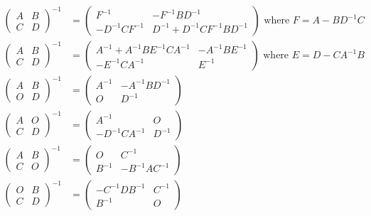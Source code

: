 \begin{align*}
  \begin{pmatrix}
    A & B \\
    C & D
  \end{pmatrix}^{-1} &=
  \begin{pmatrix}
    F^{-1}         & -F^{-1}BD^{-1} \\
    -D^{-1}CF^{-1} & D^{-1} + D^{-1}CF^{-1}BD^{-1} 
  \end{pmatrix}\text{ where }F=A-BD^{-1}C \\
  \begin{pmatrix}
    A & B \\
    C & D
  \end{pmatrix}^{-1} &=
  \begin{pmatrix}
    A^{-1} + A^{-1}BE^{-1}CA^{-1} & -A^{-1}BE^{-1} \\
    -E^{-1}CA^{-1}                & E^{-1}
  \end{pmatrix}\text{ where }E=D-CA^{-1}B
  \\
  \begin{pmatrix}
    A & B \\
    O & D
  \end{pmatrix}^{-1} &=
  \begin{pmatrix}
    A^{-1} & -A^{-1}BD^{-1} \\
    O & D^{-1}
  \end{pmatrix} \\
  \begin{pmatrix}
    A & O \\
    C & D
  \end{pmatrix}^{-1} &=
  \begin{pmatrix}
    A^{-1} & O \\ 
    -D^{-1}CA^{-1} & D^{-1}
  \end{pmatrix} \\
  \begin{pmatrix}
    A & B \\
    C & O
  \end{pmatrix}^{-1} &=
  \begin{pmatrix}
    O & C^{-1} \\ 
    B^{-1} & -B^{-1}AC^{-1}
  \end{pmatrix} \\
  \begin{pmatrix}
    O & B \\
    C & D
  \end{pmatrix}^{-1} &=
  \begin{pmatrix}
    -C^{-1}DB^{-1} & C^{-1} \\
    B^{-1} & O  
  \end{pmatrix} 
\end{align*}


